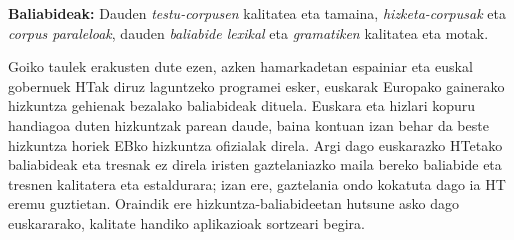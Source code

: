 \begin{multicols}{2}
\textbf{Baliabideak:} Dauden \textit{testu-corpusen} kalitatea eta tamaina, \textit{hizketa-corpusak} eta \textit{corpus paraleloak}, dauden \textit{baliabide lexikal} eta \textit{gramatiken} kalitatea eta motak.



Goiko taulek erakusten dute ezen, azken hamarkadetan espainiar eta euskal gobernuek HTak diruz laguntzeko programei esker, euskarak Europako gainerako hizkuntza gehienak bezalako baliabideak dituela. Euskara eta hizlari kopuru handiagoa duten hizkuntzak parean daude, baina kontuan izan behar da beste hizkuntza horiek EBko hizkuntza ofizialak direla. Argi dago euskarazko HTetako baliabideak eta tresnak ez direla iristen gaztelaniazko maila bereko baliabide eta tresnen kalitatera eta estaldurara; izan ere, gaztelania ondo kokatuta dago ia HT eremu guztietan. Oraindik ere hizkuntza-baliabideetan hutsune asko dago euskararako, kalitate handiko aplikazioak sortzeari begira.


\end{multicols}
